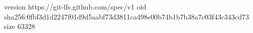 version https://git-lfs.github.com/spec/v1
oid sha256:0fbf3d1d2247f01d9d5aabf73d3811ca498e00b74b1b7b38a7c03f43c343cd73
size 63328
